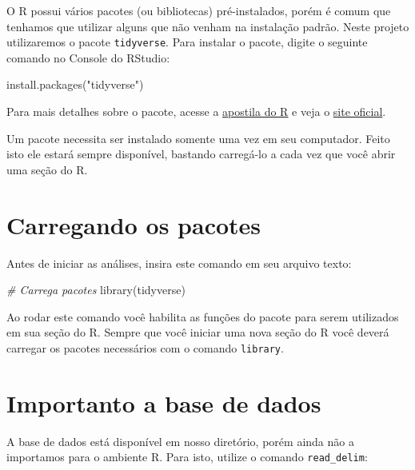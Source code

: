 \documentclass[
]{book}
\newenvironment{Shaded}{\begin{snugshade}}{\end{snugshade}}
\newcommand{\CommentTok}[1]{\textcolor[rgb]{0.56,0.35,0.01}{\textit{#1}}}
\newcommand{\FunctionTok}[1]{\textcolor[rgb]{0.00,0.00,0.00}{#1}}
\newcommand{\NormalTok}[1]{#1}
\newcommand{\StringTok}[1]{\textcolor[rgb]{0.31,0.60,0.02}{#1}}
\begin{document}
O R possui vários pacotes (ou bibliotecas) pré-instalados, porém é comum que tenhamos que utilizar alguns que não venham na instalação padrão. Neste projeto utilizaremos o pacote \texttt{tidyverse}. Para instalar o pacote, digite o seguinte comando no Console do RStudio:

\begin{Shaded}
\begin{Highlighting}[]
\FunctionTok{install.packages}\NormalTok{(}\StringTok{"tidyverse"}\NormalTok{)}
\end{Highlighting}
\end{Shaded}

Para mais detalhes sobre o pacote, acesse a \href{https://fcopf.github.io/probest-introR/tidy.html}{apostila do R} e veja o \href{https://www.tidyverse.org/}{site oficial}.

Um pacote necessita ser instalado somente uma vez em seu computador. Feito isto ele estará sempre disponível, bastando carregá-lo a cada vez que você abrir uma seção do R.

\hypertarget{carregando-os-pacotes}{%
\section{Carregando os pacotes}\label{carregando-os-pacotes}}

Antes de iniciar as análises, insira este comando em seu arquivo texto:

\begin{Shaded}
\begin{Highlighting}[]
\CommentTok{\# Carrega pacotes}
\FunctionTok{library}\NormalTok{(tidyverse)}
\end{Highlighting}
\end{Shaded}

Ao rodar este comando você habilita as funções do pacote para serem utilizados em sua seção do R. Sempre que você iniciar uma nova seção do R você deverá carregar os pacotes necessários com o comando \texttt{library}.

\hypertarget{importanto-a-base-de-dados}{%
\section{Importanto a base de dados}\label{importanto-a-base-de-dados}}

A base de dados está disponível em nosso diretório, porém ainda não a importamos para o ambiente R. Para isto, utilize o comando \texttt{read\_delim}:
\end{document}

